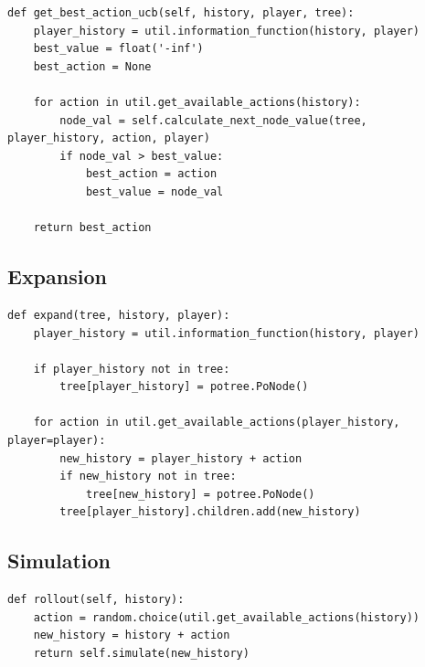 \begin{lstlisting}[style=Python]
def get_best_action_ucb(self, history, player, tree):
    player_history = util.information_function(history, player)
    best_value = float('-inf')
    best_action = None

    for action in util.get_available_actions(history):
        node_val = self.calculate_next_node_value(tree, player_history, action, player)
        if node_val > best_value:
            best_action = action
            best_value = node_val

    return best_action
\end{lstlisting}

\subsection{Expansion}\label{subsec:expansion}

\begin{lstlisting}[style=Python]
def expand(tree, history, player):
    player_history = util.information_function(history, player)

    if player_history not in tree:
        tree[player_history] = potree.PoNode()

    for action in util.get_available_actions(player_history, player=player):
        new_history = player_history + action
        if new_history not in tree:
            tree[new_history] = potree.PoNode()
        tree[player_history].children.add(new_history)
\end{lstlisting}


\subsection{Simulation}\label{subsec:simulation}

\begin{lstlisting}[style=Python]
def rollout(self, history):
    action = random.choice(util.get_available_actions(history))
    new_history = history + action
    return self.simulate(new_history)
\end{lstlisting}


